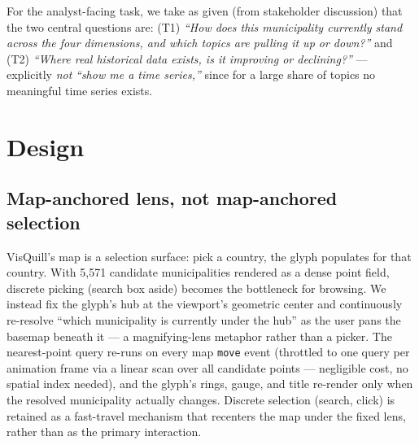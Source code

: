 \documentclass[10pt,twocolumn]{article}
\begin{document}
For the analyst-facing task, we take as given (from stakeholder discussion) that the two central questions are: (T1) \emph{``How does this municipality currently stand across the four dimensions, and which topics are pulling it up or down?''} and (T2) \emph{``Where real historical data exists, is it improving or declining?''} — explicitly \emph{not} \emph{``show me a time series,''} since for a large share of topics no meaningful time series exists.

\section{Design}
\subsection{Map-anchored lens, not map-anchored selection}
\label{sec:lens}
VisQuill's map is a selection surface: pick a country, the glyph populates for that country. With 5{,}571 candidate municipalities rendered as a dense point field, discrete picking (search box aside) becomes the bottleneck for browsing. We instead fix the glyph's hub at the viewport's geometric center and continuously re-resolve ``which municipality is currently under the hub'' as the user pans the basemap beneath it — a magnifying-lens metaphor rather than a picker. The nearest-point query re-runs on every map \texttt{move} event (throttled to one query per animation frame via a linear scan over all candidate points — negligible cost, no spatial index needed), and the glyph's rings, gauge, and title re-render only when the resolved municipality actually changes. Discrete selection (search, click) is retained as a fast-travel mechanism that recenters the map under the fixed lens, rather than as the primary interaction.
\end{document}
